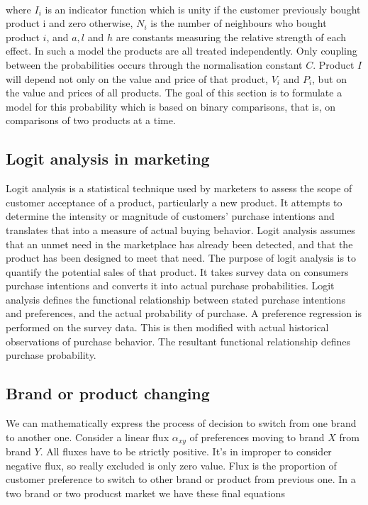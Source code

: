 \\
where $I_i$ is an indicator function which is unity if the customer previously bought product i and zero otherwise,
$N_i$ is the number of neighbours who bought product $i$, and $a, l$ and $h$ are constants measuring the relative strength
of each effect.
In such a model the products are all treated independently.
Only coupling between the probabilities occurs through the normalisation constant $C$.
Product $I$ will depend not only on the value and price of that product, $V_i$ and $P_i$, but on the value and prices of all products.
The goal of this section is to formulate a model for this probability which is based on binary comparisons, that is,
on comparisons of two products at a time.\\
\subsection{Logit analysis in marketing} \label{subsec:logit}
Logit analysis is a statistical technique used by marketers to assess the scope of customer acceptance of a product, particularly a new product.
It attempts to determine the intensity or magnitude of customers' purchase intentions and translates that into a measure of actual buying behavior.
Logit analysis assumes that an unmet need in the marketplace has already been detected, and that the product has been designed to meet that need.
The purpose of logit analysis is to quantify the potential sales of that product.
It takes survey data on consumers purchase intentions and converts it into actual purchase probabilities.
Logit analysis defines the functional relationship between stated purchase intentions and preferences, and the actual probability of purchase.
A preference regression is performed on the survey data.
This is then modified with actual historical observations of purchase behavior.
The resultant functional relationship defines purchase probability.

\subsection{Brand or product changing} \label{subsec:brand}
We can mathematically express the process of decision to switch from one brand to another one.
Consider a linear flux $\alpha_{xy}$ of preferences moving to brand $X$ from brand $Y$.
All fluxes have to be strictly positive.
It's in improper to consider negative flux, so really excluded is only zero value.
Flux is the proportion of customer preference to switch to other brand or product from previous one.
In a two brand or two producst market we have these final equations

